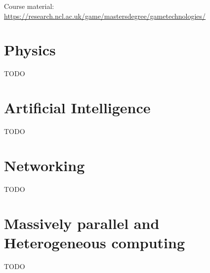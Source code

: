 \documentclass[a4paper]{article}
\begin{document}
\tableofcontents

\vfill
Course material:
\url{https://research.ncl.ac.uk/game/mastersdegree/gametechnologies/}

\section{Physics}

TODO

\section{Artificial Intelligence}

TODO

\section{Networking}

TODO

\section{Massively parallel and Heterogeneous computing}

TODO
\end{document}
